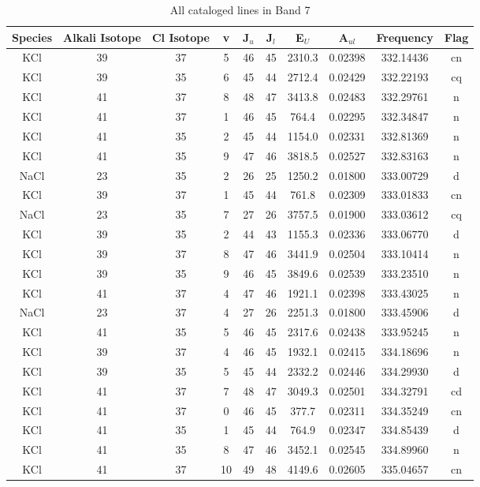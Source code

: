\begin{table*}[htp]
\centering
\caption{All cataloged lines in Band 7}
\begin{tabular}{cccccccccc}
\label{tab:all_detections_B7}
Species & Alkali Isotope & Cl Isotope & v & J$_u$ & J$_l$ & E$_U$ & A$_{ul}$ & Frequency & Flag \\
\hline
KCl & 39 & 37 & 5 & 46 & 45 & 2310.3 & 0.02398 & 332.14436 & cn \\
KCl & 39 & 35 & 6 & 45 & 44 & 2712.4 & 0.02429 & 332.22193 & cq \\
KCl & 41 & 37 & 8 & 48 & 47 & 3413.8 & 0.02483 & 332.29761 & n \\
KCl & 41 & 37 & 1 & 46 & 45 & 764.4 & 0.02295 & 332.34847 & n \\
KCl & 41 & 35 & 2 & 45 & 44 & 1154.0 & 0.02331 & 332.81369 & n \\
KCl & 41 & 35 & 9 & 47 & 46 & 3818.5 & 0.02527 & 332.83163 & n \\
NaCl & 23 & 35 & 2 & 26 & 25 & 1250.2 & 0.01800 & 333.00729 & d \\
KCl & 39 & 37 & 1 & 45 & 44 & 761.8 & 0.02309 & 333.01833 & cn \\
NaCl & 23 & 35 & 7 & 27 & 26 & 3757.5 & 0.01900 & 333.03612 & cq \\
KCl & 39 & 35 & 2 & 44 & 43 & 1155.3 & 0.02336 & 333.06770 & d \\
KCl & 39 & 37 & 8 & 47 & 46 & 3441.9 & 0.02504 & 333.10414 & n \\
KCl & 39 & 35 & 9 & 46 & 45 & 3849.6 & 0.02539 & 333.23510 & n \\
KCl & 41 & 37 & 4 & 47 & 46 & 1921.1 & 0.02398 & 333.43025 & n \\
NaCl & 23 & 37 & 4 & 27 & 26 & 2251.3 & 0.01800 & 333.45906 & d \\
KCl & 41 & 35 & 5 & 46 & 45 & 2317.6 & 0.02438 & 333.95245 & n \\
KCl & 39 & 37 & 4 & 46 & 45 & 1932.1 & 0.02415 & 334.18696 & n \\
KCl & 39 & 35 & 5 & 45 & 44 & 2332.2 & 0.02446 & 334.29930 & d \\
KCl & 41 & 37 & 7 & 48 & 47 & 3049.3 & 0.02501 & 334.32791 & cd \\
KCl & 41 & 37 & 0 & 46 & 45 & 377.7 & 0.02311 & 334.35249 & cn \\
KCl & 41 & 35 & 1 & 45 & 44 & 764.9 & 0.02347 & 334.85439 & d \\
KCl & 41 & 35 & 8 & 47 & 46 & 3452.1 & 0.02545 & 334.89960 & n \\
KCl & 41 & 37 & 10 & 49 & 48 & 4149.6 & 0.02605 & 335.04657 & cn \\

\end{tabular}
\end{table*}
